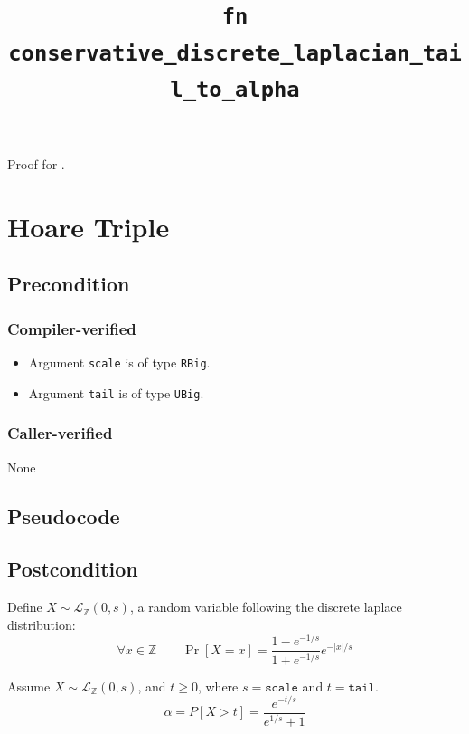 \documentclass{article}
\title{\texttt{fn conservative\_discrete\_laplacian\_tail\_to\_alpha}}
\author{\MichaelShoemateAuthor}
\begin{document}
\maketitle

Proof for .

\section{Hoare Triple}
\subsection*{Precondition}
\subsubsection*{Compiler-verified}

\begin{itemize}
    \item Argument \texttt{scale} is of type \texttt{RBig}.
    \item Argument \texttt{tail} is of type \texttt{UBig}.
\end{itemize}

\subsubsection*{Caller-verified}
None

\subsection*{Pseudocode}


\subsection*{Postcondition}
\begin{definition}
    Define $X \sim \mathcal{L}_\mathbb{Z}(0, s)$, a random variable following the discrete laplace distribution:
    \begin{equation}
        \forall x \in \mathbb{Z} \qquad \Pr[X = x] = \frac{1 - e^{-1/s}}{1 + e^{-1/s}} e^{-|x|/s}
    \end{equation}
\end{definition}

\begin{lemma}\label{lem:tail-mass}
    Assume $X \sim \mathcal{L}_\mathbb{Z}(0, s)$, and $t \ge 0$, where $s = \texttt{scale}$ and $t = \texttt{tail}$.
    \begin{equation}
        \alpha = P[X > t] = \frac{e^{-t/s}}{e^{1/s} + 1}
    \end{equation}
\end{lemma}
\end{document}
